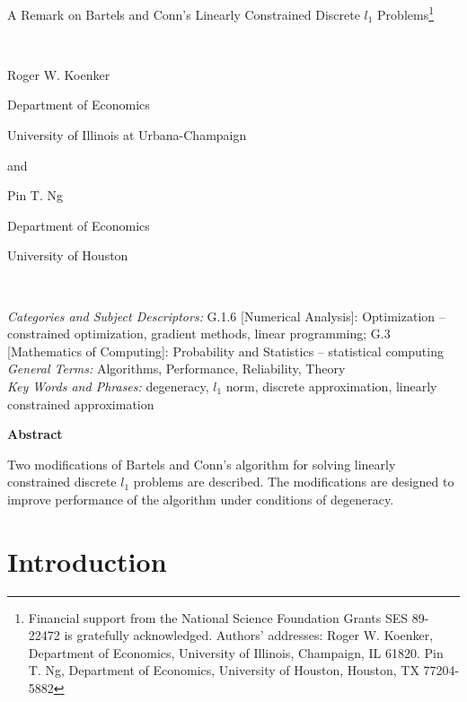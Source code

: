 







\begin{center}
{\Large A Remark on Bartels and Conn's Linearly Constrained Discrete $l_1$ Problems}\footnote{Financial support from the National
Science Foundation Grants SES 89-22472 is gratefully acknowledged.
Authors' addresses: Roger W. Koenker, Department of Economics, University
of Illinois, Champaign, IL 61820.  Pin T. Ng, Department of Economics,
University of Houston, Houston, TX 77204-5882}

\bigskip\ 

{\normalsize Roger W. Koenker}

{\normalsize Department of Economics }

{\normalsize University of Illinois at Urbana-Champaign }

{\normalsize and }

{\normalsize Pin T. Ng }

{\normalsize Department of Economics }

{\normalsize University of Houston }

\bigskip\ 
\end{center}
\noindent
{\it Categories and Subject Descriptors:} G.1.6 [Numerical Analysis]: 
Optimization -- constrained optimization, gradient methods, linear 
programming; G.3 [Mathematics of Computing]: Probability and Statistics --
statistical computing\\
{\it General Terms:} Algorithms, Performance, Reliability, Theory\\
{\it Key Words and Phrases:} degeneracy, $l_1$ norm, discrete approximation,
linearly constrained approximation \\

\begin{center}
{\bf Abstract}
\end{center}

Two modifications of Bartels and Conn's algorithm for solving linearly
constrained discrete $l_1$ problems are described.  The modifications
are designed to improve performance of the algorithm under conditions 
of degeneracy.

\section{Introduction}

